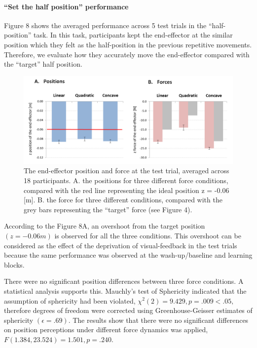 \paragraph{“Set the half position” performance}
Figure 8 shows the averaged performance across 5 test trials in the “half-position” task. In this task, participants kept the end-effector at the similar position which they felt as the half-position in the previous repetitive movements. Therefore, we evaluate how they accurately move the end-effector compared with the “target” half position.
%
\begin{figure}
  \centering
  \includegraphics[scale=0.5]{Chie/figs/Figure8.png}
  \caption{The end-effector position and force at the test trial, averaged across 18 participants. 
A. the positions for three different force conditions, compared with the red line representing the ideal position z = -0.06 [m]. B. the force for three different conditions, compared with the grey bars representing the “target” force (see Figure 4).}
  \label{testrial}
\end{figure}
According to the Figure 8A, an overshoot  from the target position $(z = -0.06 m)$ is observed for all the three conditions. This overshoot can be considered as the effect of the deprivation of visual-feedback in the test trials because the same performance was observed at the wash-up/baseline and learning blocks.

There were no significant position differences between three force conditions. A statistical analysis supports this. Mauchly’s test of Sphericity indicated that the assumption of sphericity had been violated, $χ^2 (2) = 9.429, p = .009 < .05, $ therefore degrees of freedom were corrected using Greenhouse-Geisser estimates of sphericity $(\epsilon = .69)$. The results show that there were no significant differences on position perceptions under different force dynamics was applied, $F(1.384, 23.524) = 1.501, p = .240$.

